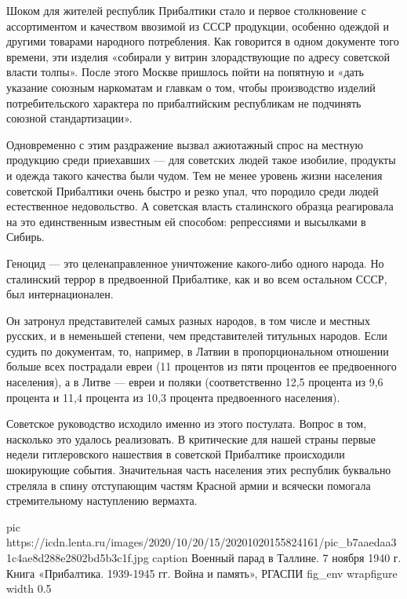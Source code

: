Шоком для жителей республик Прибалтики стало и первое столкновение с
ассортиментом и качеством ввозимой из СССР продукции, особенно одеждой и
другими товарами народного потребления. Как говорится в одном документе того
времени, эти изделия «собирали у витрин злорадствующие по адресу советской
власти толпы». После этого Москве пришлось пойти на попятную и «дать указание
союзным наркоматам и главкам о том, чтобы производство изделий потребительского
характера по прибалтийским республикам не подчинять союзной стандартизации».

Одновременно с этим раздражение вызвал ажиотажный спрос на местную продукцию
среди приехавших — для советских людей такое изобилие, продукты и одежда такого
качества были чудом. Тем не менее уровень жизни населения советской Прибалтики
очень быстро и резко упал, что породило среди людей естественное недовольство.
А советская власть сталинского образца реагировала на это единственным
известным ей способом: репрессиями и высылками в Сибирь.


Геноцид — это целенаправленное уничтожение какого-либо одного народа. Но
сталинский террор в предвоенной Прибалтике, как и во всем остальном СССР, был
интернационален.

Он затронул представителей самых разных народов, в том числе и местных русских,
и в неменьшей степени, чем представителей титульных народов. Если судить по
документам, то, например, в Латвии в пропорциональном отношении больше всех
пострадали евреи (11 процентов из пяти процентов ее предвоенного населения), а
в Литве — евреи и поляки (соответственно 12,5 процента из 9,6 процента и 11,4
процента из 10,3 процента предвоенного населения).


Советское руководство исходило именно из этого постулата. Вопрос в том,
насколько это удалось реализовать. В критические для нашей страны первые недели
гитлеровского нашествия в советской Прибалтике происходили шокирующие события.
Значительная часть населения этих республик буквально стреляла в спину
отступающим частям Красной армии и всячески помогала стремительному наступлению
вермахта.

\ifcmt
pic https://icdn.lenta.ru/images/2020/10/20/15/20201020155824161/pic_b7aaedaa31c4ae8d288e2802bd5b3c1f.jpg
caption Военный парад в Таллине. 7 ноября 1940 г.  Книга «Прибалтика. 1939-1945 гг. Война и память», РГАСПИ
fig_env wrapfigure
width 0.5
\fi

